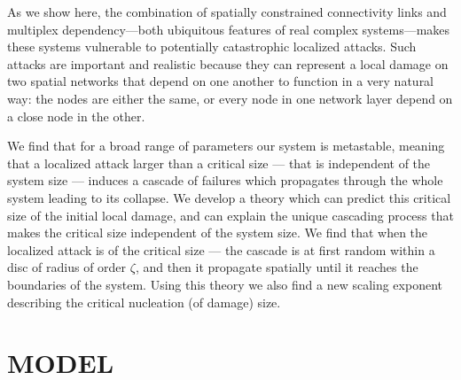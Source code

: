 \documentclass[twocolumn,noshowpacs,pre,preprintnumbers,superscriptaddress,amsmath,amssymb,floatfix]{revtex4}
\begin{document}
	As we show here, the combination of spatially constrained connectivity links and multiplex dependency---both ubiquitous features of real complex systems---makes these systems vulnerable to potentially catastrophic localized attacks. 
	Such attacks are important and realistic because they can represent a local damage on two spatial networks that depend on one another to function in a very natural way: the nodes are either the same, or every node in one network layer depend on a close node in the other.
	
	We find that for a broad range of parameters our system is metastable, meaning that a localized attack larger than a critical size --- that is independent of the system size --- induces a cascade of failures which propagates through the whole system leading to its collapse.
	We develop a theory which can predict this critical size of the initial local damage, and can explain the unique cascading process that makes the critical size independent of the system size.
	We find that when the localized attack is of the critical size --- the cascade is at first random within a disc of radius of order $\zeta$, and then it propagate  spatially until it reaches the boundaries of the system.
	Using this theory we also find a new scaling exponent describing the critical nucleation (of damage) size.
	
	
	\section{MODEL}
	
\end{document}
